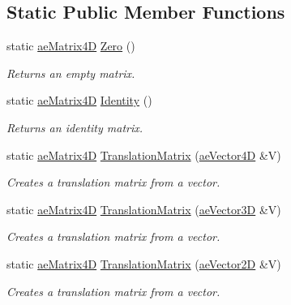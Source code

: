 \subsection*{Static Public Member Functions}
\begin{DoxyCompactItemize}
\item 
static \hyperlink{structae_core_1_1ae_matrix4_d}{ae\+Matrix4D} \hyperlink{structae_core_1_1ae_matrix4_d_a395f66c8a623bd6d5823c61d84ca6320}{Zero} ()
\begin{DoxyCompactList}\small\item\em Returns an empty matrix. \end{DoxyCompactList}\item 
static \hyperlink{structae_core_1_1ae_matrix4_d}{ae\+Matrix4D} \hyperlink{structae_core_1_1ae_matrix4_d_a8d95bc33bdea15cd0cc6c6777e5a027a}{Identity} ()
\begin{DoxyCompactList}\small\item\em Returns an identity matrix. \end{DoxyCompactList}\item 
static \hyperlink{structae_core_1_1ae_matrix4_d}{ae\+Matrix4D} \hyperlink{structae_core_1_1ae_matrix4_d_a416099df4590d0bdf4a47ff4b5b48905}{Translation\+Matrix} (\hyperlink{structae_core_1_1ae_vector4_d}{ae\+Vector4D} \&V)
\begin{DoxyCompactList}\small\item\em Creates a translation matrix from a vector. \end{DoxyCompactList}\item 
static \hyperlink{structae_core_1_1ae_matrix4_d}{ae\+Matrix4D} \hyperlink{structae_core_1_1ae_matrix4_d_ab9a367949c726eb5bb3398a250e9976d}{Translation\+Matrix} (\hyperlink{structae_core_1_1ae_vector3_d}{ae\+Vector3D} \&V)
\begin{DoxyCompactList}\small\item\em Creates a translation matrix from a vector. \end{DoxyCompactList}\item 
static \hyperlink{structae_core_1_1ae_matrix4_d}{ae\+Matrix4D} \hyperlink{structae_core_1_1ae_matrix4_d_a7807ad112cf7263b34b14a70aa25edbf}{Translation\+Matrix} (\hyperlink{structae_core_1_1ae_vector2_d}{ae\+Vector2D} \&V)
\begin{DoxyCompactList}\small\item\em Creates a translation matrix from a vector. \end{DoxyCompactList}\item 

\end{DoxyCompactItemize}
